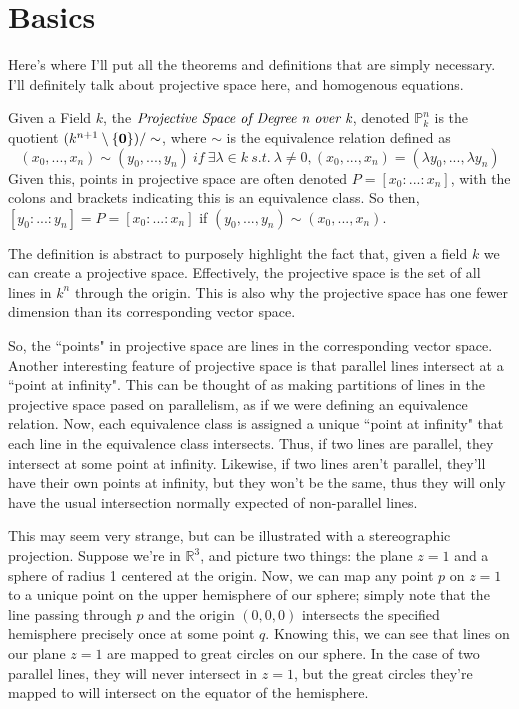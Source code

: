 \section{Basics}
Here's where I'll put all the theorems and definitions that
are simply necessary. I'll definitely talk about projective
space here, and homogenous equations.

\begin{mydef}
Given a Field $k$, the $\emph{Projective Space of Degree n over k}$, denoted $\mathbb{P}^n_k$
is the quotient $(k^{n+1} \setminus \{\bold{0}\}) / \sim$, where $\sim$ is the equivalence relation 
defined as 
\[
(x_0, ..., x_n) \sim (y_0, ..., y_n)~if~\exists \lambda \in k~s.t.~\lambda \neq 0,
(x_0, ..., x_n) = (\lambda y_0, ..., \lambda y_n)
\]
Given this, points in projective space are often denoted $P = [ x_0 : ... : x_n]$,
with the colons and brackets indicating this is an equivalence class. So then,
$[ y_0: ... : y_n ] = P = [ x_0 : ... : x_n ]$ if $(y_0, ..., y_n) \sim (x_0, ..., x_n)$.
\end{mydef}
The definition is abstract to purposely highlight the fact that, 
given a field $k$ we can create a projective space.
Effectively, the projective space is the set of all lines in 
$k^n$ through the origin. This is also why the projective space
has one fewer dimension than its corresponding vector space.

So, the ``points" in projective space are lines in the corresponding
vector space. Another interesting feature of projective space is
that parallel lines intersect at a ``point at infinity". This can
be thought of as making partitions of lines in the projective space
pased on parallelism, as if we were defining an equivalence relation.
Now, each equivalence class is assigned a unique ``point at infinity"
that each line in the equivalence class intersects. Thus, if two lines
are parallel, they intersect at some point at infinity. Likewise, if
two lines aren't parallel, they'll have their own points at infinity,
but they won't be the same, thus they will only have the usual intersection
normally expected of non-parallel lines.

This may seem very strange, but can be illustrated with a stereographic
projection. Suppose we're in $\mathbb{R}^3$, and picture two things:
the plane $z=1$ and a sphere of radius 1 centered at the origin.
Now, we can map any point $p$ on $z=1$ to a unique point on the upper
hemisphere of our sphere; simply note that the line passing through
$p$ and the origin $(0, 0, 0)$ intersects the specified hemisphere
precisely once at some point $q$. Knowing this, we can see that lines
on our plane $z=1$ are mapped to great circles on our sphere. In the
case of two parallel lines, they will never intersect in $z=1$, but
the great circles they're mapped to will intersect on the equator of 
the hemisphere.

